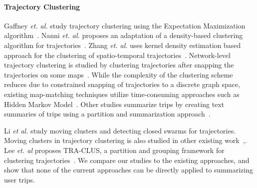 \paragraph{Trajectory Clustering}
Gaffney \emph{et. al.} study trajectory clustering using the Expectation Maximization algorithm~\cite{gaffney1999trajectory}. Nanni \emph{et. al.} proposes an adaptation of a density-based clustering algorithm for trajectories~\cite{nanni2006time}. Zhang \emph{et. al.} uses kernel density estimation based approach for the clustering of spatio-temporal trajectories~\cite{Zhang}. Network-level trajectory clustering is studied by clustering trajectories after snapping the trajectories on some maps~\cite{mapmatch1, mapmatch2}. While the complexity of the clustering scheme reduces due to constrained snapping of trajectories to a discrete graph space, existing map-matching techniques utilize time-consuming approaches such as Hidden Markov Model~\cite{krumm}. Other studies summarize trips by creating text summaries of trips using a partition and summarization approach~\cite{su2015making}. 

Li \emph{et al.}\cite{Li2010} study moving clusters and detecting closed swarms for trajectories. Moving clusters in trajectory clustering is also studied in other existing work~\cite{flock1},\cite{flock2}. Lee \emph{et. al} proposes TRA-CLUS, a partition and grouping framework for clustering trajectories~\cite{Lee2007}. We compare our studies to the existing approaches, and show that none of the current approaches can be directly applied to summarizing user trips.